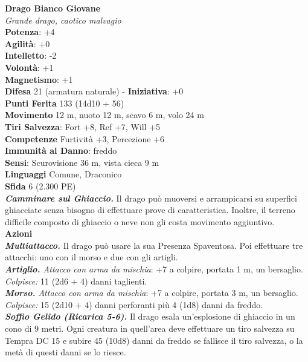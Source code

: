 \begin{multicols}{2}
\medskip\textbf{Drago Bianco Giovane}\\
\emph{Grande drago, caotico malvagio} \\
\textbf{Potenza}: +4 \\
\textbf{Agilità}: +0 \\
\textbf{Intelletto}: -2\\
\textbf{Volontà}: +1\\
\textbf{Magnetismo}: +1\\
\textbf{Difesa} 21 (armatura naturale) - \textbf{Iniziativa}: +0\\
\textbf{Punti Ferita} 133 (14d10 + 56)\\
\textbf{Movimento} 12 m, nuoto 12 m, scavo 6 m, volo 24 m\\
\textbf{Tiri Salvezza}: Fort +8, Ref +7, Will +5\\
\textbf{Competenze} Furtività +3, Percezione +6\\
\textbf{Immunità al Danno}: freddo\\
\textbf{Sensi}: Scurovisione 36 m, vista cieca 9 m\\
\textbf{Linguaggi} Comune, Draconico\\
\textbf{Sfida} 6 (2.300 PE)\smallskip\\
\emph{\textbf{Camminare sul Ghiaccio.}} Il drago può muoversi e arrampicarsi su superfici ghiacciate senza bisogno di effettuare prove di caratteristica. Inoltre, il terreno difficile composto di ghiaccio o neve non gli costa movimento aggiuntivo.\\
\smallskip\textbf{Azioni}\\
\emph{\textbf{Multiattacco.}} Il drago può usare la sua Presenza Spaventosa. Poi effettuare tre attacchi: uno con il morso e due con gli artigli.\\
\emph{\textbf{Artiglio.} Attacco con arma da mischia}: +7 a colpire, portata 1 m, un bersaglio.\\
\emph{Colpisce:} 11 (2d6 + 4) danni taglienti.\\
\emph{\textbf{Morso.} Attacco con arma da mischia}: +7 a colpire, portata 3 m, un bersaglio.\\
\emph{Colpisce:} 15 (2d10 + 4) danni perforanti più 4 (1d8) danni da freddo.\\
\emph{\textbf{Soffio Gelido (Ricarica 5-6).}} Il drago esala un'esplosione di ghiaccio in un cono di 9 metri. Ogni creatura in quell'area deve effettuare un tiro salvezza su Tempra DC 15 e subire 45 (10d8) danni da freddo se fallisce il tiro salvezza, o la metà di questi danni se lo riesce.\\

\end{multicols}
